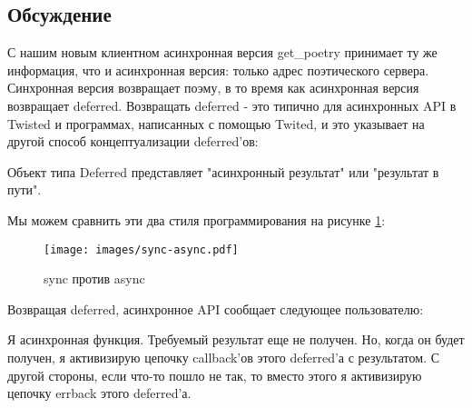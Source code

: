 \subsection{Обсуждение}

С нашим новым клиентном асинхронная версия get\_poetry 
принимает ту же информация, что и асинхронная версия: 
только адрес поэтического сервера. Синхронная версия 
возвращает поэму, в то время как асинхронная версия 
возвращает deferred. Возвращать deferred - это типично для 
асинхронных API в Twisted и программах, написанных с 
помощью Twited, и это указывает на другой способ концептуализации deferred'ов:


Объект типа Deferred представляет "асинхронный результат" или 
"результат в пути".


Мы можем сравнить эти два стиля программирования на рисунке \ref{fig:sync-async}:

\begin{figure}[h]
\begin{center}
    \texttt{[image: images/sync-async.pdf]}
    \caption{sync против async\label{fig:sync-async}}
\end{center}
\end{figure}


Возвращая deferred, асинхронное API сообщает следующее пользователю:

    Я асинхронная функция. Требуемый результат еще не получен. 
Но, когда он будет получен, я активизирую цепочку callback'ов 
этого deferred'а с результатом. С другой стороны, если что-то пошло 
не так, то вместо этого я активизирую цепочку errback этого deferred'а.


